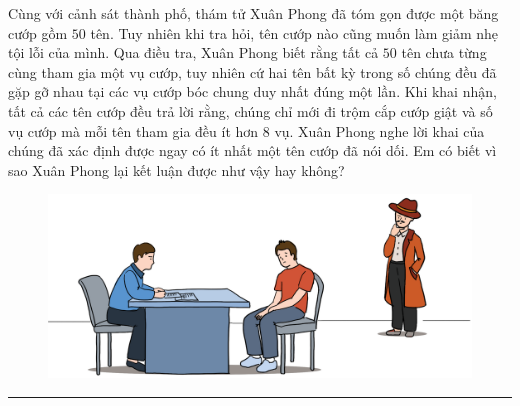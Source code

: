 \centering
\endgroup
\vspace*{25pt} 
\begin{multicols}{2}
	Cùng với cảnh sát thành phố, thám tử Xuân Phong đã tóm gọn được một băng cướp gồm $50$ tên. Tuy nhiên khi tra hỏi, tên cướp nào cũng muốn làm giảm nhẹ tội lỗi của mình. Qua điều tra, Xuân Phong biết rằng tất cả $50$ tên chưa từng cùng tham gia một vụ cướp, tuy nhiên cứ hai tên bất kỳ trong số chúng đều đã gặp gỡ nhau tại các vụ cướp bóc chung duy nhất đúng một lần. Khi khai nhận, tất cả các tên cướp đều trả lời rằng, chúng chỉ mới đi trộm cắp cướp giật và số vụ cướp mà mỗi tên tham gia đều ít hơn $8$ vụ. Xuân Phong nghe lời khai của chúng đã xác định được ngay có ít nhất một tên cướp đã nói dối. Em có biết vì sao Xuân Phong lại kết luận được như vậy hay không?
\end{multicols}
\begin{figure}[H]
	\centering
	\vspace*{-15pt}
	\captionsetup{labelformat= empty, justification=centering}
	\includegraphics[width=0.85\linewidth]{xp}
	\vspace*{-10pt}
\end{figure}
\vspace*{-10pt}
{\color{toancuabi}\rule{1\linewidth}{0.1pt}}
\begingroup
